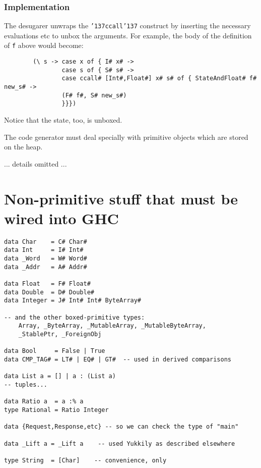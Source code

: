 \subsubsection{Implementation}

The desugarer unwraps the \mbox{\tt {\char'137}ccall{\char'137}} construct by inserting the necessary 
evaluations etc to unbox the arguments.  For example, the body of the definition 
of \mbox{\tt f} above would become:
\begin{verbatim}
        (\ s -> case x of { I# x# -> 
                case s of { S# s# ->
                case ccall# [Int#,Float#] x# s# of { StateAndFloat# f# new_s# ->
                (F# f#, S# new_s#)
                }}})
\end{verbatim}
Notice that the state, too, is unboxed.

The code generator must deal specially with primitive objects which
are stored on the heap.

... details omitted ...

%
%

\section{Non-primitive stuff that must be wired into GHC}

\begin{verbatim}
data Char    = C# Char#
data Int     = I# Int#
data _Word   = W# Word#
data _Addr   = A# Addr#

data Float   = F# Float#
data Double  = D# Double#
data Integer = J# Int# Int# ByteArray#

-- and the other boxed-primitive types:
    Array, _ByteArray, _MutableArray, _MutableByteArray,
    _StablePtr, _ForeignObj

data Bool     = False | True
data CMP_TAG# = LT# | EQ# | GT#  -- used in derived comparisons

data List a = [] | a : (List a)
-- tuples...

data Ratio a  = a :% a
type Rational = Ratio Integer

data {Request,Response,etc} -- so we can check the type of "main"

data _Lift a = _Lift a    -- used Yukkily as described elsewhere

type String  = [Char]    -- convenience, only
\end{verbatim}

